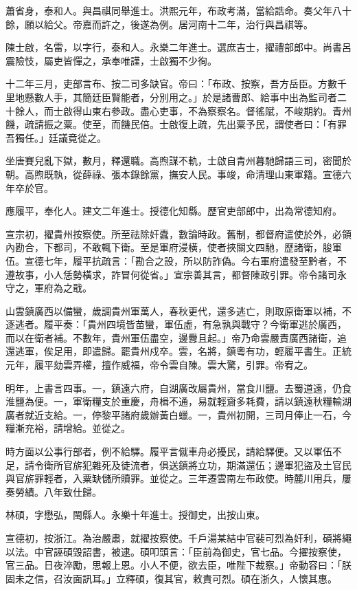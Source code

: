 \begin{pinyinscope}
蕭省身，泰和人。與昌祺同舉進士。洪熙元年，布政考滿，當給誥命。奏父年八十餘，願以給父。帝嘉而許之，後遂為例。居河南十二年，治行與昌祺等。

陳士啟，名雷，以字行，泰和人。永樂二年進士。選庶吉士，擢禮部郎中。尚書呂震險忮，屬吏皆憚之，承奉唯謹，士啟獨不少徇。

十二年三月，吏部言布、按二司多缺官。帝曰：「布政、按察，吾方岳臣。方數千里地懸數人手，其簡廷臣賢能者，分別用之。」於是諸曹郎、給事中出為監司者二十餘人，而士啟得山東右參政。盡心吏事，不為察察名。督徭賦，不峻期約。青州饑，疏請振之粟。使至，而饑民倍。士啟復上疏，先出粟予民，謂使者曰：「有罪吾獨任。」廷議竟從之。

坐唐賽兒亂下獄，數月，釋還職。高煦謀不軌，士啟自青州暮馳歸語三司，密聞於朝。高煦既執，從薛祿、張本錄餘黨，撫安人民。事竣，命清理山東軍籍。宣德六年卒於官。

應履平，奉化人。建文二年進士。授德化知縣。歷官吏部郎中，出為常德知府。

宣宗初，擢貴州按察使。所至祛除奸蠹，數論時政。舊制，都督府遣使於外，必領內勘合，下都司，不敢輒下衛。至是軍府浸橫，使者挾關文四馳，歷諸衛，朘軍伍。宣德七年，履平抗疏言：「勘合之設，所以防詐偽。今右軍府遣發至黔者，不遵故事，小人恁勢橫求，詐冒何從省。」宣宗善其言，都督陳政引罪。帝令諸司永守之，軍府為之戢。

山雲鎮廣西以備蠻，歲調貴州軍萬人，春秋更代，還多逃亡，則取原衛軍以補，不逐逃者。履平奏：「貴州四境皆苗蠻，軍伍虛，有急孰與戰守？今衛軍逃於廣西，而以在衛者補。不數年，貴州軍伍盡空，邊釁且起。」帝乃命雲嚴責廣西諸衛，追還逃軍，俟足用，即遣歸。罷貴州戍卒。雲，名將，鎮粵有功，輕履平書生。正統元年，履平劾雲弄權，擅作威福，帝令雲自陳。雲大驚，引罪。帝宥之。

明年，上書言四事。一，鎮遠六府，自湖廣改屬貴州，當食川鹽。去蜀道遠，仍食淮鹽為便。一，軍衛糧支於重慶，舟楫不通，易就輕齎多耗費，請以鎮遠秋糧輸湖廣者就近支給。一，停黎平諸府歲辦黃白蠟。一，貴州初開，三司月俸止一石，今糧漸充裕，請增給。並從之。

時方面以公事行部者，例不給驛。履平言僦車舟必擾民，請給驛便。又以軍伍不足，請令衛所官旂犯雜死及徒流者，俱送鎮將立功，期滿還伍；邊軍犯盜及土官民與官旂罪輕者，入粟缺儲所贖罪。並從之。三年遷雲南左布政使。時麓川用兵，屢奏勞績。八年致仕歸。

林碩，字懋弘，閩縣人。永樂十年進士。授御史，出按山東。

宣德初，按浙江。為治嚴肅，就擢按察使。千戶湯某結中官裴可烈為奸利，碩將繩以法。中官誣碩毀詔書，被逮。碩叩頭言：「臣前為御史，官七品。今擢按察使，官三品。日夜淬勵，思報上恩。小人不便，欲去臣，唯陛下裁察。」帝動容曰：「朕固未之信，召汝面訊耳。」立釋碩，復其官，敕責可烈。碩在浙久，人懷其惠。


\end{pinyinscope}
